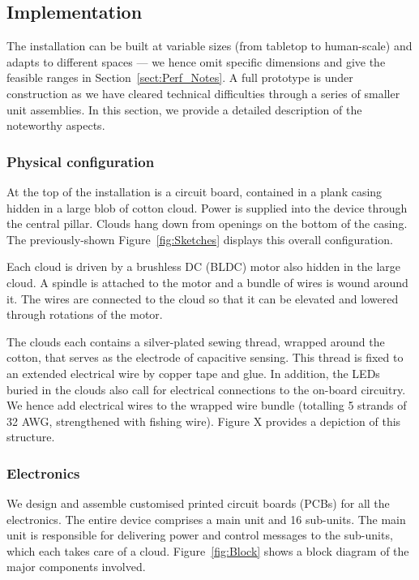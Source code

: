 \documentclass{nimemusic}
\begin{document}
\subsection{Implementation}
The installation can be built at variable sizes (from tabletop to human-scale) and adapts to different spaces --- we hence omit specific dimensions and give the feasible ranges in Section~\ref{sect:Perf_Notes}. A full prototype is under construction as we have cleared technical difficulties through a series of smaller unit assemblies. In this section, we provide a detailed description of the noteworthy aspects.

\subsubsection{Physical configuration}
At the top of the installation is a circuit board, contained in a plank casing hidden in a large blob of cotton cloud. Power is supplied into the device through the central pillar. Clouds hang down from openings on the bottom of the casing. The previously-shown Figure~\ref{fig:Sketches} displays this overall configuration.

Each cloud is driven by a brushless DC (BLDC) motor also hidden in the large cloud. A spindle is attached to the motor and a bundle of wires is wound around it. The wires are connected to the cloud so that it can be elevated and lowered through rotations of the motor.

The clouds each contains a silver-plated sewing thread, wrapped around the cotton, that serves as the electrode of capacitive sensing. This thread is fixed to an extended electrical wire by copper tape and glue. In addition, the LEDs buried in the clouds also call for electrical connections to the on-board circuitry. We hence add electrical wires to the wrapped wire bundle (totalling 5 strands of 32 AWG, strengthened with fishing wire). Figure X provides a depiction of this structure.

\subsubsection{Electronics}
We design and assemble customised printed circuit boards (PCBs) for all the electronics. The entire device comprises a main unit and 16 sub-units. The main unit is responsible for delivering power and control messages to the sub-units, which each takes care of a cloud. Figure~\ref{fig:Block} shows a block diagram of the major components involved.
\end{document}
